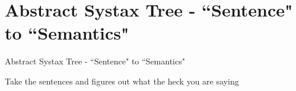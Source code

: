 \section{Abstract Systax Tree - ``Sentence" to ``Semantics"}
\begin{frame}{Abstract Systax Tree - ``Sentence" to ``Semantics"}
    \begin{itemize}
        {\LARGE \item[-] Take the sentences and figures out what the heck you are saying}
    \end{itemize}
\end{frame}
